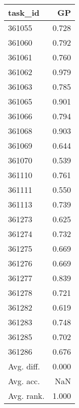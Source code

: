 \begin{tabular}{lr}
\toprule
task\_id & GP \\
\midrule
361055 & 0.728 \\
361060 & 0.792 \\
361061 & 0.760 \\
361062 & 0.979 \\
361063 & 0.785 \\
361065 & 0.901 \\
361066 & 0.794 \\
361068 & 0.903 \\
361069 & 0.644 \\
361070 & 0.539 \\
361110 & 0.761 \\
361111 & 0.550 \\
361113 & 0.739 \\
361273 & 0.625 \\
361274 & 0.732 \\
361275 & 0.669 \\
361276 & 0.669 \\
361277 & 0.839 \\
361278 & 0.721 \\
361282 & 0.619 \\
361283 & 0.748 \\
361285 & 0.702 \\
361286 & 0.676 \\
Avg. diff. & 0.000 \\
Avg. acc. & NaN \\
Avg. rank. & 1.000 \\
\bottomrule
\end{tabular}
